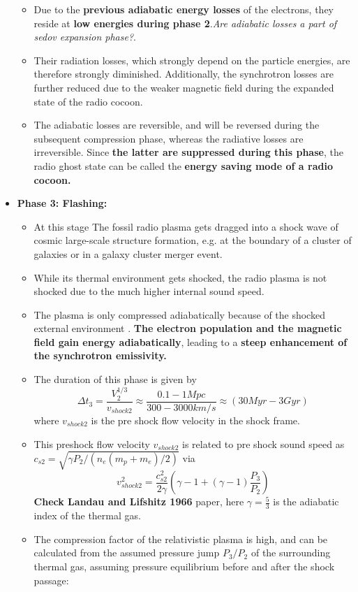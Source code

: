 \documentclass[11pt]{report}
\newcommand{\tbf}[1]{\textbf{#1}}
\newcommand{\tit}[1]{\textit{#1}}
\newcommand{\cc}[1]{\left({#1}\right)}
\begin{document}
\begin{itemize}
\begin{itemize}
\item Due to the \tbf{previous adiabatic energy losses} of the electrons, they reside at \tbf{low energies during phase 2}.\tit{Are adiabatic losses a part of sedov expansion phase?}.
\item Their radiation losses, which strongly depend on the particle energies, are therefore strongly diminished.  Additionally, the synchrotron losses are further reduced due to the weaker magnetic field during the expanded state of the radio cocoon.
\item The adiabatic losses are reversible, and will be reversed during the subsequent compression phase, whereas the radiative losses are irreversible. Since \tbf{the latter are suppressed during this phase}, the radio ghost state can be called the \tbf{energy saving mode of a radio cocoon.}
\end{itemize}
\item \textbf{Phase 3: Flashing:} 
\begin{itemize}
\item At this stage The fossil radio plasma gets dragged into a shock wave of cosmic large-scale structure formation, e.g. at the boundary of a cluster of galaxies or in a galaxy cluster merger event.
\item  While its thermal environment gets shocked, the radio plasma is not shocked due to the much higher internal sound speed.
\item The plasma is only compressed adiabatically because of the shocked external environment . \tbf{The electron population and the magnetic field gain energy adiabatically}, leading to a \tbf{steep enhancement of the synchrotron emissivity.}
\item The duration of this phase is given by
\begin{equation}
\Delta t_3= \frac{V^{1/3}_2}{v_{shock2}}\approx \frac{0.1-1Mpc}{300-3000km/s}\approx \cc{30Myr-3Gyr}
\end{equation} 
where $v_{shock2}$ is the pre shock flow velocity in the shock frame.
\item This preshock flow velocity $v_{shock2}$ is related to pre shock sound speed as $c_{s2}=\sqrt{\gamma P_2/\cc{n_e(m_p+m_e)/2}}$ via
\begin{equation}
v^2 _{shock2}=\frac{c^2_{s2}}{2 \gamma}\cc{\gamma-1+(\gamma-1)\frac{P_3}{P_2}}
\end{equation}
\textbf{Check Landau and Lifshitz 1966} paper, here $\gamma=\frac{5}{3}$ is the adiabatic index of the thermal gas.
\item  The compression factor of the relativistic plasma is high, and can be calculated from the assumed pressure jump $P_3/P_2$ of the surrounding thermal gas, assuming pressure equilibrium before and after the shock passage:

\end{itemize}
\end{itemize}
\end{document}
